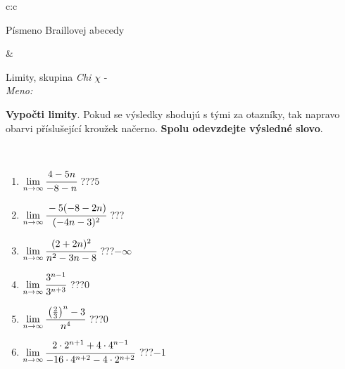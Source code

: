 \documentclass[10pt]{report}
\begin{document}
\begin{tabular}{c:c}
\begin{minipage}[c][104.5mm][t]{0.5\linewidth}
\begin{center}
\begin{minipage}{0.20\linewidth}
\begin{center}
{\small Písmeno Braillovej abecedy}
\end{center}
\end{minipage}
\end{center}
\end{minipage}
&
\begin{minipage}[c][104.5mm][t]{0.5\linewidth}
\begin{center}
\vspace{7mm}
{\huge Limity, skupina \textit{Chi $\chi$} -}\\[5mm]
\textit{Meno:}\phantom{xxxxxxxxxxxxxxxxxxxxxxxxxxxxxxxxxxxxxxxxxxxxxxxxxxxxxxxxxxxxxxxxx}\\[5mm]
\begin{minipage}{0.95\linewidth}
\begin{center}
\textbf{Vypočti limity}. Pokud se výsledky shodujú s tými za otazníky, tak napravo\\obarvi příslušející kroužek načerno. \textbf{Spolu odevzdejte výsledné slovo}.
\end{center}
\end{minipage}
\\[1mm]
\begin{minipage}{0.79\linewidth}
\begin{center}
\begin{varwidth}{\linewidth}
\begin{enumerate}
\normalsize
\item $\lim\limits_{n\to\infty}\cfrac{4-5n}{-8-n}$\quad \dotfill\; ???\;\dotfill \quad $5$
\item $\lim\limits_{n\to\infty}\cfrac{-5(-8-2n)}{(-4n-3)^2}$\quad \dotfill\; ???\;\dotfill {}
\item $\lim\limits_{n\to\infty}\cfrac{(2+2n)^2}{n^2-3n-8}$\quad \dotfill\; ???\;\dotfill \quad $-\infty$
\item $\lim\limits_{n\to\infty}\cfrac{3^{n-1}}{3^{n+3}}$\quad \dotfill\; ???\;\dotfill \quad $0$
\item $\lim\limits_{n\to\infty}\cfrac{\left(\frac{2}{3}\right)^n -3}{n^{4}}$\quad \dotfill\; ???\;\dotfill \quad $0$
\item $\lim\limits_{n\to\infty}\cfrac{2\cdot 2^{n+1}+4\cdot 4^{n-1}}{-16\cdot 4^{n+2}-4\cdot 2^{n+2}}$\quad \dotfill\; ???\;\dotfill \quad $-1$
\end{enumerate}
\end{varwidth}
\end{center}
\end{minipage}
\begin{minipage}{0.20\linewidth}

\end{minipage}
\end{center}
\end{minipage}
\end{tabular}
\end{document}
